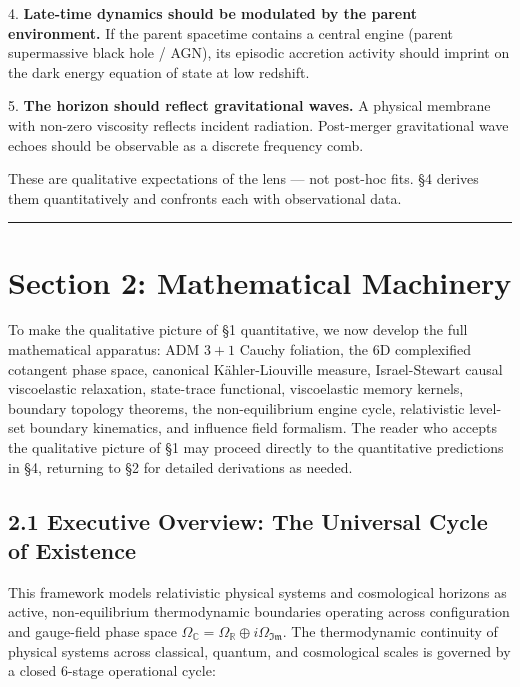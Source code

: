 \documentclass[11pt,a4paper]{article}
\theoremstyle{definition}\newtheorem{definition}{Definition}
\theoremstyle{remark}\newtheorem{remark}{Remark}
\begin{document}
4. \textbf{Late-time dynamics should be modulated by the parent environment.} If the parent spacetime contains a central engine (parent supermassive black hole / AGN), its episodic accretion activity should imprint on the dark energy equation of state at low redshift.

5. \textbf{The horizon should reflect gravitational waves.} A physical membrane with non-zero viscosity reflects incident radiation. Post-merger gravitational wave echoes should be observable as a discrete frequency comb.

These are qualitative expectations of the lens — not post-hoc fits. §4 derives them quantitatively and confronts each with observational data.

\noindent\rule{\linewidth}{0.4pt}
\section{Section 2: Mathematical Machinery}

To make the qualitative picture of §1 quantitative, we now develop the full mathematical apparatus: ADM $3+1$ Cauchy foliation, the 6D complexified cotangent phase space, canonical Kähler-Liouville measure, Israel-Stewart causal viscoelastic relaxation, state-trace functional, viscoelastic memory kernels, boundary topology theorems, the non-equilibrium engine cycle, relativistic level-set boundary kinematics, and influence field formalism. The reader who accepts the qualitative picture of §1 may proceed directly to the quantitative predictions in §4, returning to §2 for detailed derivations as needed.
\subsection{2.1 Executive Overview: The Universal Cycle of Existence}

This framework models relativistic physical systems and cosmological horizons as active, non-equilibrium thermodynamic boundaries operating across configuration and gauge-field phase space $\Omega_{\mathbb{C}} = \Omega_{\mathbb{R}} \oplus i \Omega_{\mathfrak{Im}}$. The thermodynamic continuity of physical systems across classical, quantum, and cosmological scales is governed by a closed 6-stage operational cycle:
\end{document}
